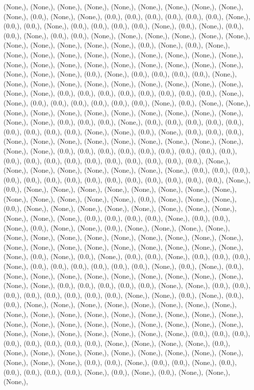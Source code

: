\documentclass{article}
\begin{document}
(None,), (None,), (None,), (None,), (None,), (None,), (None,), (None,), (None,), (None,), (0.0,), (None,), (None,), (0.0,), (0.0,), (0.0,), (0.0,), (0.0,), (0.0,), (None,), (0.0,), (0.0,), (None,), (0.0,), (0.0,), (0.0,), (0.0,), (None,), (0.0,), (None,), (0.0,), (0.0,), (None,), (0.0,), (0.0,), (None,), (None,), (None,), (None,), (None,), (None,), (None,), (None,), (None,), (None,), (None,), (0.0,), (None,), (0.0,), (None,), (None,), (None,), (None,), (None,), (None,), (None,), (None,), (None,), (None,), (None,), (None,), (None,), (None,), (None,), (None,), (None,), (None,), (None,), (None,), (None,), (None,), (0.0,), (None,), (0.0,), (0.0,), (0.0,), (0.0,), (None,), (None,), (None,), (None,), (None,), (None,), (None,), (None,), (None,), (None,), (None,), (None,), (0.0,), (0.0,), (0.0,), (0.0,), (0.0,), (0.0,), (0.0,), (0.0,), (None,), (None,), (0.0,), (0.0,), (0.0,), (0.0,), (0.0,), (0.0,), (None,), (0.0,), (None,), (None,), (None,), (None,), (None,), (None,), (None,), (None,), (None,), (None,), (None,), (None,), (None,), (0.0,), (0.0,), (0.0,), (None,), (0.0,), (0.0,), (0.0,), (0.0,), (0.0,), (0.0,), (0.0,), (0.0,), (0.0,), (None,), (None,), (0.0,), (None,), (0.0,), (0.0,), (0.0,), (None,), (None,), (None,), (None,), (None,), (None,), (None,), (None,), (None,), (None,), (None,), (0.0,), (0.0,), (0.0,), (0.0,), (0.0,), (0.0,), (0.0,), (0.0,), (0.0,), (0.0,), (0.0,), (0.0,), (0.0,), (0.0,), (0.0,), (0.0,), (0.0,), (0.0,), (0.0,), (None,), (None,), (None,), (None,), (None,), (None,), (None,), (None,), (0.0,), (0.0,), (0.0,), (0.0,), (0.0,), (0.0,), (0.0,), (0.0,), (0.0,), (0.0,), (0.0,), (0.0,), (0.0,), (0.0,), (None,), (0.0,), (None,), (None,), (None,), (None,), (None,), (None,), (None,), (None,), (None,), (None,), (None,), (None,), (None,), (0.0,), (None,), (None,), (None,), (0.0,), (None,), (None,), (None,), (None,), (None,), (None,), (None,), (None,), (None,), (None,), (None,), (0.0,), (0.0,), (0.0,), (0.0,), (None,), (0.0,), (0.0,), (None,), (0.0,), (None,), (None,), (0.0,), (None,), (None,), (None,), (None,), (None,), (None,), (None,), (None,), (None,), (None,), (None,), (None,), (None,), (None,), (None,), (None,), (None,), (None,), (None,), (None,), (None,), (None,), (None,), (0.0,), (None,), (0.0,), (None,), (0.0,), (0.0,), (None,), (0.0,), (0.0,), (0.0,), (None,), (0.0,), (0.0,), (0.0,), (0.0,), (0.0,), (0.0,), (None,), (0.0,), (None,), (0.0,), (None,), (None,), (None,), (None,), (None,), (None,), (None,), (None,), (None,), (None,), (None,), (0.0,), (0.0,), (0.0,), (0.0,), (0.0,), (None,), (None,), (0.0,), (0.0,), (0.0,), (0.0,), (0.0,), (0.0,), (0.0,), (0.0,), (None,), (None,), (0.0,), (None,), (0.0,), (0.0,), (None,), (None,), (None,), (None,), (None,), (None,), (None,), (None,), (None,), (None,), (None,), (None,), (None,), (None,), (None,), (None,), (None,), (None,), (None,), (None,), (None,), (None,), (None,), (None,), (None,), (None,), (None,), (None,), (None,), (None,), (None,), (None,), (None,), (0.0,), (0.0,), (0.0,), (0.0,), (0.0,), (0.0,), (0.0,), (0.0,), (None,), (None,), (None,), (None,), (0.0,), (None,), (None,), (None,), (None,), (None,), (None,), (None,), (None,), (None,), (None,), (None,), (None,), (0.0,), (0.0,), (None,), (0.0,), (0.0,), (None,), (0.0,), (0.0,), (0.0,), (0.0,), (0.0,), (None,), (0.0,), (None,), (0.0,), (None,), (None,), (None,), 
\end{document}

